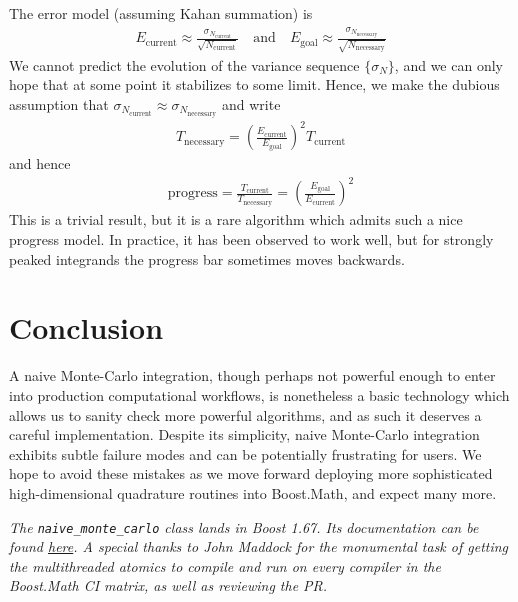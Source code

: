 \documentclass{ansarticle}
\begin{document}
The error model (assuming Kahan summation) is
\begin{align*}
E_{\mathrm{current}} \approx \frac{\sigma_{N_{\mathrm{current}}}}{\sqrt{N_{\mathrm{current}}}}
\quad \mathrm{and} \quad
E_{\mathrm{goal}} \approx \frac{\sigma_{N_{\mathrm{necessary}}}}{\sqrt{N_{\mathrm{necessary}}}}
\end{align*}
We cannot predict the evolution of the variance sequence $\{\sigma_{N}\}$, and we can only hope that at some point it stabilizes to some limit.
Hence, we make the dubious assumption that $\sigma_{N_{\mathrm{current}}} \approx \sigma_{N_{\mathrm{necessary}}}$ and write
\begin{align*}
T_{\mathrm{necessary}} = \left( \frac{E_{\mathrm{current}}}{E_{\mathrm{goal}}} \right)^{2}T_{\mathrm{current}}
\end{align*}
and hence
\begin{align*}
\mathrm{progress} = \frac{T_{\mathrm{current}}}{T_{\mathrm{necessary}}} = \left( \frac{E_{\mathrm{goal}}}{E_{\mathrm{current}}} \right)^{2}
\end{align*}
This is a trivial result, but it is a rare algorithm which admits such a nice progress model.
In practice, it has been observed to work well, but for strongly peaked integrands the progress bar sometimes moves backwards.

\section{Conclusion}

A naive Monte-Carlo integration, though perhaps not powerful enough to enter into production computational workflows, is nonetheless a basic technology which allows us to sanity check more powerful algorithms, and as such it deserves a careful implementation.
Despite its simplicity, naive Monte-Carlo integration exhibits subtle failure modes and can be potentially frustrating for users.
We hope to avoid these mistakes as we move forward deploying more sophisticated high-dimensional quadrature routines into Boost.Math, and expect many more.



\emph{The \texttt{naive_monte_carlo} class lands in Boost 1.67. Its documentation can be found \href{http://www.boost.org/doc/libs/1_67_0/libs/math/doc/html/quadrature.html}{here}. A special thanks to John Maddock for the monumental task of getting the multithreaded atomics to compile and run on every compiler in the Boost.Math CI matrix, as well as reviewing the PR.}



\end{document}
